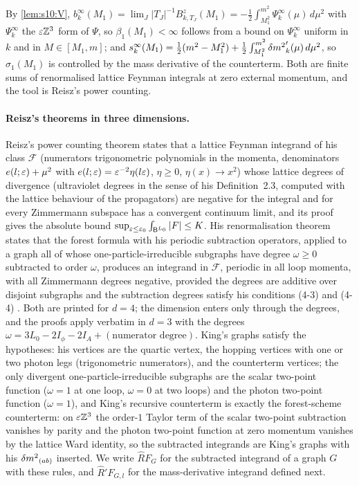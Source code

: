By \cref{lem:s10:V}, $b^\infty_k(M_1)=\lim_J|T_J|^{-1}B^z_{k,T_J}(M_1)=-\frac12\int_{M_1^2}^{m^2}\Psi^\infty_k(\mu)\,d\mu^2$ with $\Psi^\infty_k$ the $\varepsilon\mathbb Z^3$ form of $\Psi$, so $\beta_1(M_1)<\infty$ follows from a bound on $\Psi^\infty_k$ uniform in $k$ and in $M\in[M_1,m]$; and $s^\infty_k(M_1)=\frac12(m^2-M_1^2)+\frac12\int_{M_1^2}^{m^2}{\delta m^2}_k'(\mu)\,d\mu^2$, so $\sigma_1(M_1)$ is controlled by the mass derivative of the counterterm. Both are finite sums of renormalised lattice Feynman integrals at zero external momentum, and the tool is Reisz's power counting.

\paragraph{Reisz's theorems in three dimensions.} Reisz's power counting theorem \cite[Thm.~1]{Rei88} states that a lattice Feynman integrand of his class $\mathcal F$ (numerators trigonometric polynomials in the momenta, denominators $e(l;\varepsilon)+\mu^2$ with $e(l;\varepsilon)=\varepsilon^{-2}\eta(l\varepsilon)$, $\eta\ge0$, $\eta(x)\to x^2$) whose lattice degrees of divergence (ultraviolet degrees in the sense of his Definition~2.3, computed with the lattice behaviour of the propagators) are negative for the integral and for every Zimmermann subspace has a convergent continuum limit, and its proof gives the absolute bound $\sup_{\varepsilon\le\varepsilon_0}\int_{\mathsf B^{L_0}}|F|\le K$. His renormalisation theorem \cite{Rei88b} states that the forest formula with his periodic subtraction operators, applied to a graph all of whose one-particle-irreducible subgraphs have degree $\omega\ge0$ subtracted to order $\omega$, produces an integrand in $\mathcal F$, periodic in all loop momenta, with all Zimmermann degrees negative, provided the degrees are additive over disjoint subgraphs and the subtraction degrees satisfy his conditions (4-3) and (4-4) \cite[Lemma~5.2]{Rei88b}. Both are printed for $d=4$; the dimension enters only through the degrees, and the proofs apply verbatim in $d=3$ with the degrees $\omega=3L_0-2I_\phi-2I_A+(\text{numerator degree})$. King's graphs satisfy the hypotheses: his vertices are the quartic vertex, the hopping vertices with one or two photon legs (trigonometric numerators), and the counterterm vertices; the only divergent one-particle-irreducible subgraphs are the scalar two-point function ($\omega=1$ at one loop, $\omega=0$ at two loops) and the photon two-point function ($\omega=1$), and King's recursive counterterm is exactly the forest-scheme counterterm: on $\varepsilon\mathbb Z^3$ the order-$1$ Taylor term of the scalar two-point subtraction vanishes by parity and the photon two-point function at zero momentum vanishes by the lattice Ward identity, so the subtracted integrands are King's graphs with his ${\delta m^2}_{(ab)}$ inserted. We write $\hat RF_G$ for the subtracted integrand of a graph $G$ with these rules, and $\hat R'F_{G,l}$ for the mass-derivative integrand defined next.

